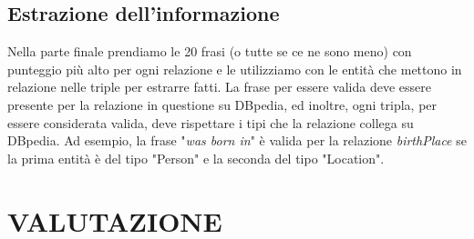 \documentclass[10pt,a4paper,twocolumn]{article}
\begin{document}
\subsection{Estrazione dell'informazione}

Nella parte finale prendiamo le 20 frasi (o tutte se ce ne sono meno) con punteggio più alto per ogni relazione e le utilizziamo con le entità che mettono in relazione nelle triple per estrarre fatti. La frase per essere valida deve essere presente per la relazione in questione su DBpedia, ed inoltre, ogni tripla, per essere considerata valida, deve rispettare i tipi che la relazione collega su DBpedia. Ad esempio, la frase "\textit{was born in}" è valida per la relazione \textit{birthPlace} se la prima entità è del tipo "Person" e la seconda del tipo "Location".

\section{VALUTAZIONE}
\end{document}
